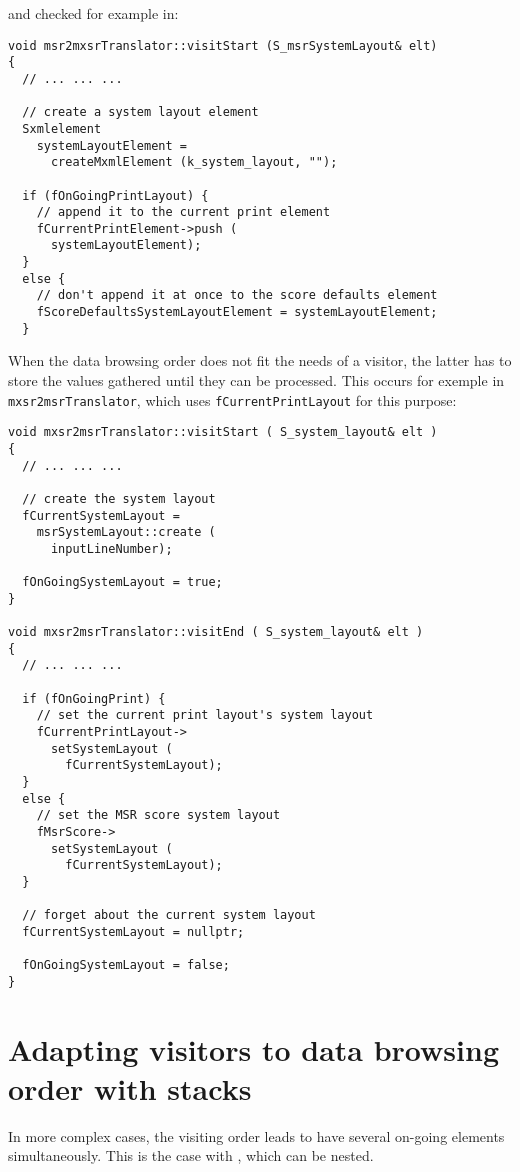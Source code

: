 and checked for example in:
\begin{lstlisting}[language=CPlusPlus]
void msr2mxsrTranslator::visitStart (S_msrSystemLayout& elt)
{
  // ... ... ...

  // create a system layout element
  Sxmlelement
    systemLayoutElement =
      createMxmlElement (k_system_layout, "");

  if (fOnGoingPrintLayout) {
    // append it to the current print element
    fCurrentPrintElement->push (
      systemLayoutElement);
  }
  else {
    // don't append it at once to the score defaults element
    fScoreDefaultsSystemLayoutElement = systemLayoutElement;
  }
\end{lstlisting}


When the data browsing order does not fit the needs of a visitor, the latter has to store the values gathered until they can be processed. This occurs for exemple in {\tt mxsr2msrTranslator}, which uses {\tt fCurrentPrintLayout} for this purpose:
\begin{lstlisting}[language=CPlusPlus]
void mxsr2msrTranslator::visitStart ( S_system_layout& elt )
{
  // ... ... ...

  // create the system layout
  fCurrentSystemLayout =
    msrSystemLayout::create (
      inputLineNumber);

  fOnGoingSystemLayout = true;
}

void mxsr2msrTranslator::visitEnd ( S_system_layout& elt )
{
  // ... ... ...

  if (fOnGoingPrint) {
    // set the current print layout's system layout
    fCurrentPrintLayout->
      setSystemLayout (
        fCurrentSystemLayout);
  }
  else {
    // set the MSR score system layout
    fMsrScore->
      setSystemLayout (
        fCurrentSystemLayout);
  }

  // forget about the current system layout
  fCurrentSystemLayout = nullptr;

  fOnGoingSystemLayout = false;
}
\end{lstlisting}


\section{Adapting visitors to data browsing order with stacks}

In more complex cases, the visiting order leads to have several on-going elements simultaneously. This is the case with , which can be nested.

